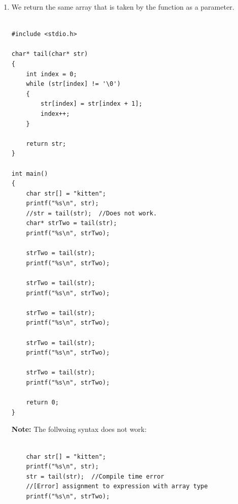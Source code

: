 \documentclass[12pt]{article}
\begin{document}
\begin{enumerate}
\begin{verbatim}
    for (int i = 0; i < 10; i++)
    {
        array[i] = i;
        printf("Value: %02d at address: %d\n", 
        *(array + i), (array + i));
    }

    return array;
}

int main()
{
    int arrSize = 10;
    int* arr = returnHeapArray(arrSize);

    printf("\n");

    for (int i = 0; i < arrSize; i++)
    {
        printf("Value: %02d at address: %d\n", 
        *(arr + i), (arr + i));
    }

    free(arr);

    return 0;
}

\end{verbatim}

    \newpage

    \item We return the same array that is taken by the function as a parameter.
    
\begin{verbatim}

#include <stdio.h>

char* tail(char* str)
{
    int index = 0;
    while (str[index] != '\0')
    {
        str[index] = str[index + 1];
        index++;
    }

    return str;
}

int main()
{
    char str[] = "kitten";
    printf("%s\n", str);
    //str = tail(str);  //Does not work.
    char* strTwo = tail(str);
    printf("%s\n", strTwo);

    strTwo = tail(str);
    printf("%s\n", strTwo);

    strTwo = tail(str);
    printf("%s\n", strTwo);

    strTwo = tail(str);
    printf("%s\n", strTwo);

    strTwo = tail(str);
    printf("%s\n", strTwo);

    strTwo = tail(str);
    printf("%s\n", strTwo);

    return 0;
}

\end{verbatim}

\textbf{Note:} The follwoing syntax does not work:

\begin{verbatim}

    char str[] = "kitten";
    printf("%s\n", str);
    str = tail(str);  //Compile time error
    //[Error] assignment to expression with array type
    printf("%s\n", strTwo);


\end{verbatim}
\end{enumerate}
\end{document}
